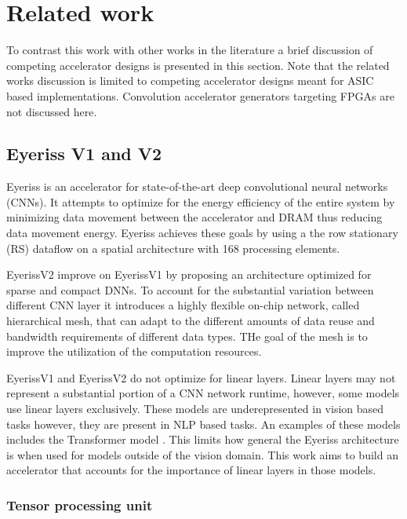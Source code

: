 \section{Related work}
\label{chap:related_work}

To contrast this work with other works in the literature a brief discussion of
competing accelerator designs is presented in this section. Note that the
related works discussion is limited to competing accelerator designs meant for
ASIC based implementations. Convolution accelerator generators targeting FPGAs
are not discussed here.

\subsection{Eyeriss V1 and V2}
\label{chap:related_work:eyeriss}

Eyeriss \cite{isscc_2016_chen_eyeriss} is an accelerator for state-of-the-art
deep convolutional neural networks (CNNs). It attempts to optimize for the
energy efficiency of the entire system by minimizing data movement between the
accelerator and DRAM thus reducing data movement energy. Eyeriss achieves these
goals by using a the row stationary (RS) dataflow on a spatial architecture with
168 processing elements. 

EyerissV2 \cite{eyerissv2} improve on EyerissV1 by proposing an architecture
optimized for sparse and compact DNNs. To account for the substantial variation
between different CNN layer it introduces a highly flexible on-chip network,
called hierarchical mesh, that can adapt to the different amounts of data reuse
and bandwidth requirements of different data types. THe goal of the mesh is to
improve the utilization of the computation resources.

EyerissV1 and EyerissV2 do not optimize for linear layers. Linear layers may not
represent a substantial portion of a CNN network runtime, however, some models
use linear layers exclusively. These models are underepresented in vision based
tasks however, they are present in NLP based tasks. An examples of these
models includes the Transformer model \cite{transformer_model}. This limits how general the
Eyeriss architecture is when used for models outside of the vision domain. This
work aims to build an accelerator that accounts for the importance of linear
layers in those models. 

\subsubsection{Tensor processing unit}
\label{chap:related_work:tpu  }

